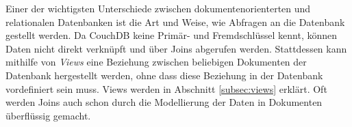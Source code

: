 Einer der wichtigsten Unterschiede zwischen dokumentenorienterten und relationalen Datenbanken ist die Art und Weise, wie Abfragen an die Datenbank gestellt werden. Da CouchDB keine Primär- und Fremdschlüssel kennt, können Daten nicht direkt verknüpft und über Joins abgerufen werden. Stattdessen kann mithilfe von \textit{Views} eine Beziehung zwischen beliebigen Dokumenten der Datenbank hergestellt werden, ohne dass diese Beziehung in der Datenbank vordefiniert sein muss. Views werden in Abschnitt \ref{subsec:views} erklärt. Oft werden Joins auch schon durch die Modellierung der Daten in Dokumenten  überflüssig gemacht.

